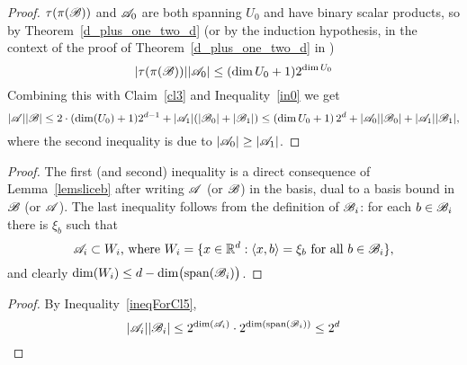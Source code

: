 \ineqkey*
\begin{proof}
    $\tau(\pi({\mathscr{B}}))$ and ${\mathscr{A}}_0$ are both spanning $U_0$ and have binary scalar products, so by Theorem~\ref{d_plus_one_two_d} (or by the induction hypothesis, in the context of the proof of Theorem~\ref{d_plus_one_two_d} in \cite{kupavskii22})
    \[
        |\tau(\pi({\mathscr{B}}))||{\mathscr{A}}_0| \leq (\operatorname{dim}U_0+1)2^{\operatorname{dim}U_0}
    \]
    Combining this with Claim~\ref{cl3} and Inequality~\ref{in0} we get
    \[
        |{\mathscr{A}}||{\mathscr{B}}| \leq 2 \cdot (\operatorname{dim}(U_0)+1)2^{d - 1} + |{\mathscr{A}}_1|(|{\mathscr{B}}_0| + |{\mathscr{B}}_1|) \leq \left(\operatorname{dim}U_0+1\right)2^d + |{\mathscr{A}}_0||{\mathscr{B}}_0| + |{\mathscr{A}}_1||{\mathscr{B}}_1|,
    \]
    where the second inequality is due to $|{\mathscr{A}}_0| \geq |{\mathscr{A}}_1|$.
\end{proof}

\ineqforclfive*
\begin{proof}
    The first (and second) inequality is a direct consequence of Lemma~\ref{lemsliceb} after writing ${\mathscr{A}}$ (or ${\mathscr{B}}$) in the basis, dual to a basis bound in ${\mathscr{B}}$ (or ${\mathscr{A}}$). The last inequality follows from the definition of ${\mathscr{B}}_i$: for each $b \in {\mathscr{B}}_i$ there is $\xi_b$ such that 
    \[
        {\mathscr{A}}_i \subset W_i\text{, where }W_i = \{ x \in {\mathbb{R}}^d : \langle x,b\rangle = \xi_b \text{ for all } b \in {\mathscr{B}}_i \},
    \] 
    and clearly $\operatorname{dim}(W_i) \leq d - \operatorname{dim}\bigl(\operatorname{span}({\mathscr{B}}_i)\bigr)$.
\end{proof}

\claimaaaibbi*
\begin{proof}
    By Inequality~\ref{ineqForCl5}, 
    \[
        |{\mathscr{A}}_i||{\mathscr{B}}_i| \leq 2^{\operatorname{dim}({\mathscr{A}}_i)} \cdot 2^{\operatorname{dim}(\operatorname{span}({\mathscr{B}}_i))} \leq 2^d
    \]
\end{proof}